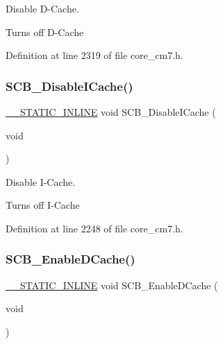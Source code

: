 Disable D-\/\+Cache. 

Turns off D-\/\+Cache 

Definition at line 2319 of file core\+\_\+cm7.\+h.

\mbox{\label{group___c_m_s_i_s___core___cache_functions_gaba757390852f95b3ac2d8638c717d8d8}} 
\subsubsection{\texorpdfstring{S\+C\+B\+\_\+\+Disable\+I\+Cache()}{SCB\_DisableICache()}}
{\footnotesize\ttfamily \hyperlink{cmsis__iccarm_8h_aba87361bfad2ae52cfe2f40c1a1dbf9c}{\+\_\+\+\_\+\+S\+T\+A\+T\+I\+C\+\_\+\+I\+N\+L\+I\+NE} void S\+C\+B\+\_\+\+Disable\+I\+Cache (\begin{DoxyParamCaption}\item[{void}]{ }\end{DoxyParamCaption})}



Disable I-\/\+Cache. 

Turns off I-\/\+Cache 

Definition at line 2248 of file core\+\_\+cm7.\+h.

\mbox{\label{group___c_m_s_i_s___core___cache_functions_ga63aa640d9006021a796a5dcf9c7180b6}} 
\subsubsection{\texorpdfstring{S\+C\+B\+\_\+\+Enable\+D\+Cache()}{SCB\_EnableDCache()}}
{\footnotesize\ttfamily \hyperlink{cmsis__iccarm_8h_aba87361bfad2ae52cfe2f40c1a1dbf9c}{\+\_\+\+\_\+\+S\+T\+A\+T\+I\+C\+\_\+\+I\+N\+L\+I\+NE} void S\+C\+B\+\_\+\+Enable\+D\+Cache (\begin{DoxyParamCaption}\item[{void}]{ }\end{DoxyParamCaption})}




